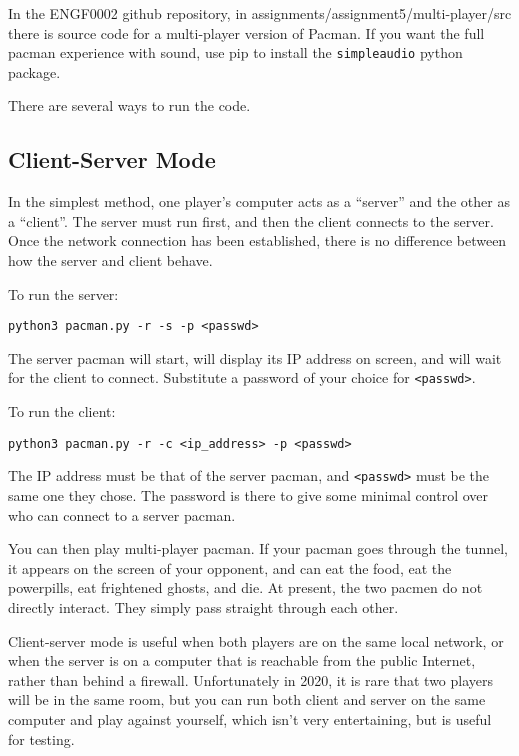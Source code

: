 \documentclass{article}
\begin{document}
In the ENGF0002 github repository, in
assignments/assignment5/multi-player/src there is source code for a
multi-player version of Pacman.  If you want the full pacman
experience with sound, use pip to install the {\tt simpleaudio} python
package.

There are several ways to run the code.

\subsection*{Client-Server Mode}

In the simplest method, one
player's computer acts as a ``server'' and the other as a ``client''.
The server must run first, and then the client connects to the server.
Once the network connection has been established, there is no
difference between how the server and client behave.

To run the server:

\begin{verbatim}
python3 pacman.py -r -s -p <passwd>
\end{verbatim}

The server pacman will start, will display its IP address on screen,
and will wait for the client to connect.  Substitute a password of your choice for {\tt <passwd>}.

To run the client:

\begin{verbatim}
python3 pacman.py -r -c <ip_address> -p <passwd>
\end{verbatim}

The IP address must be that of the server pacman, and {\tt <passwd>} must be
the same one they chose.  The password is there to give some minimal
control over who can connect to a server pacman.

You can then play multi-player pacman.  If your pacman goes through
the tunnel, it appears on the screen of your opponent, and can eat the
food, eat the powerpills, eat frightened ghosts, and die.  At present,
the two pacmen do not directly interact.  They simply pass straight
through each other.

Client-server mode is useful when both players are on the same local
network, or when the server is on a computer that is reachable from
the public Internet, rather than behind a firewall.  Unfortunately in
2020, it is rare that two players will be in the same room, but you
can run both client and server on the same computer and play against
yourself, which isn't very entertaining, but is useful for testing.
\end{document}
